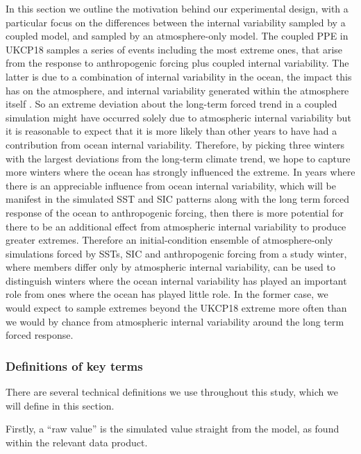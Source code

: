       In this section we outline the motivation behind our experimental design, with a particular focus on the differences between the internal variability sampled by a coupled model, and sampled by an atmosphere-only model. The coupled PPE in UKCP18 samples a series of events including the most extreme ones, that arise from the response to anthropogenic forcing plus coupled internal variability. The latter is due to a combination of internal variability in the ocean, the impact this has on the atmosphere, and internal variability generated within the atmosphere itself \citep{sexton_detection_2001}. So an extreme deviation about the long-term forced trend in a coupled simulation might have occurred solely due to atmospheric internal variability but it is reasonable to expect that it is more likely than other years to have had a contribution from ocean internal variability. Therefore, by picking three winters with the largest deviations from the long-term climate trend, we hope to capture more winters where the ocean has strongly influenced the extreme. In years where there is an appreciable influence from ocean internal variability, which will be manifest in the simulated SST and SIC patterns along with the long term forced response of the ocean to anthropogenic forcing, then there is more potential for there to be an additional effect from atmospheric internal variability to produce greater extremes. Therefore an initial-condition ensemble of atmosphere-only simulations forced by SSTs, SIC and anthropogenic forcing from a study winter, where members differ only by atmospheric internal variability, can be used to distinguish winters where the ocean internal variability has played an important role from ones where the ocean has played little role. In the former case, we would expect to sample extremes beyond the UKCP18 extreme more often than we would by chance from atmospheric internal variability around the long term forced response.
  
    \subsubsection{Definitions of key terms}

      There are several technical definitions we use throughout this study, which we will define in this section.

      Firstly, a ``raw value'' is the simulated value straight from the model, as found within the relevant data product.

